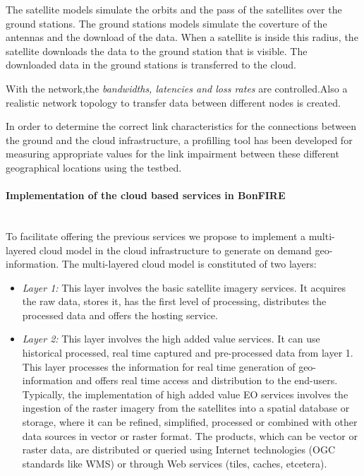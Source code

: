 The satellite models simulate the orbits and the pass of the satellites over the ground stations. The ground stations models simulate the coverture of the antennas and the download of the data. When a satellite is inside this radius, the satellite downloads the data to the ground station that is visible. The downloaded data in the ground stations is transferred to the \bonfire cloud.

With the \vw network,the \emph{bandwidths, latencies and loss rates} are
controlled.Also a realistic network topology to transfer data between different
nodes is created.

In order to determine the correct link characteristics for the connections
between the ground and the cloud infrastructure, a profilling tool has been
developed for measuring appropriate values for the link impairment between these different geographical locations using the \pl testbed.


\paragraph{Implementation of the cloud based services in BonFIRE}~\\
To facilitate offering the previous services we propose to implement a multi-layered cloud model in the \bonfire cloud infrastructure to generate on demand geo-information. The multi-layered cloud model is constituted of two layers:
\begin{itemize}
\item \emph{Layer 1:} This layer involves the basic satellite imagery services.  It acquires the raw data, stores it, has the first level of processing, distributes the processed data and offers the hosting service.

\item \emph{Layer 2:} This layer involves the high added value services. It can use historical processed, real time captured and pre-processed data from layer 1. This layer processes the information for real time generation of geo-information and offers real time access and distribution to the end-users. Typically, the implementation of high added value EO services involves the ingestion of the raster imagery from the satellites into a spatial database or storage, where it can be refined, simplified, processed or combined with other data sources in vector or raster format. The products, which can be vector or raster data, are distributed or queried using Internet technologies (\ac{OGC} standards like \ac{WMS}) or through Web services (tiles, caches, etcetera).
\end{itemize}

